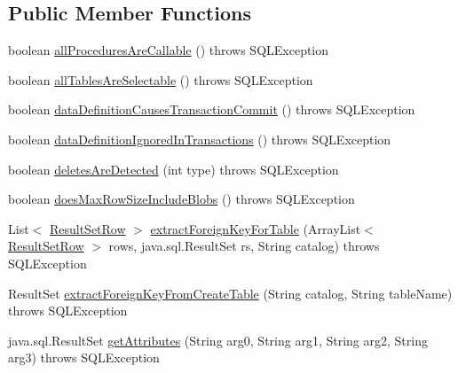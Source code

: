 \subsection*{Public Member Functions}
\begin{DoxyCompactItemize}
\item 
boolean \mbox{\hyperlink{classcom_1_1mysql_1_1jdbc_1_1_database_meta_data_a3edc654c645e8c0114f7a9ef9fb77184}{all\+Procedures\+Are\+Callable}} ()  throws S\+Q\+L\+Exception 
\item 
boolean \mbox{\hyperlink{classcom_1_1mysql_1_1jdbc_1_1_database_meta_data_acc4fce370c0509f7b804c81850ec17e9}{all\+Tables\+Are\+Selectable}} ()  throws S\+Q\+L\+Exception 
\item 
boolean \mbox{\hyperlink{classcom_1_1mysql_1_1jdbc_1_1_database_meta_data_a3e9b1fc64d7d21396454a7fcb28ec8a9}{data\+Definition\+Causes\+Transaction\+Commit}} ()  throws S\+Q\+L\+Exception 
\item 
boolean \mbox{\hyperlink{classcom_1_1mysql_1_1jdbc_1_1_database_meta_data_acc113d98cbf5da60459095401e8f91b7}{data\+Definition\+Ignored\+In\+Transactions}} ()  throws S\+Q\+L\+Exception 
\item 
boolean \mbox{\hyperlink{classcom_1_1mysql_1_1jdbc_1_1_database_meta_data_a2285b39a35023c91168afdebbfd4e935}{deletes\+Are\+Detected}} (int type)  throws S\+Q\+L\+Exception 
\item 
boolean \mbox{\hyperlink{classcom_1_1mysql_1_1jdbc_1_1_database_meta_data_a7efb88b6c4c1890107716849cdefbbb7}{does\+Max\+Row\+Size\+Include\+Blobs}} ()  throws S\+Q\+L\+Exception 
\item 
List$<$ \mbox{\hyperlink{classcom_1_1mysql_1_1jdbc_1_1_result_set_row}{Result\+Set\+Row}} $>$ \mbox{\hyperlink{classcom_1_1mysql_1_1jdbc_1_1_database_meta_data_ac9b74074950b106a415701c336002c18}{extract\+Foreign\+Key\+For\+Table}} (Array\+List$<$ \mbox{\hyperlink{classcom_1_1mysql_1_1jdbc_1_1_result_set_row}{Result\+Set\+Row}} $>$ rows, java.\+sql.\+Result\+Set rs, String catalog)  throws S\+Q\+L\+Exception 
\item 
Result\+Set \mbox{\hyperlink{classcom_1_1mysql_1_1jdbc_1_1_database_meta_data_a674d55ea080a7c9051cbb85224526184}{extract\+Foreign\+Key\+From\+Create\+Table}} (String catalog, String table\+Name)  throws S\+Q\+L\+Exception 
\item 
java.\+sql.\+Result\+Set \mbox{\hyperlink{classcom_1_1mysql_1_1jdbc_1_1_database_meta_data_a838b298c0d9bc6061ba699e76100f66d}{get\+Attributes}} (String arg0, String arg1, String arg2, String arg3)  throws S\+Q\+L\+Exception 

\end{DoxyCompactItemize}
